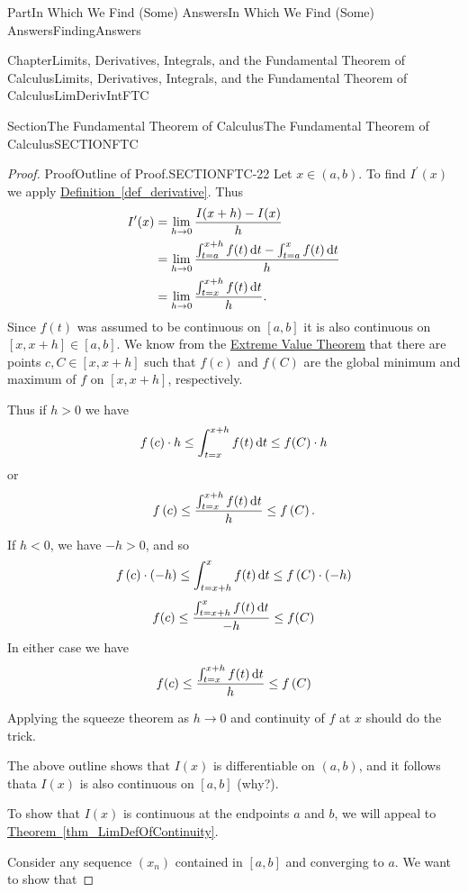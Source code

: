 \documentclass[oneside,10pt,]{book}
\newcommand{\xreffont}{\relax}
\numberwithin{equation}{part}
\newcommand{\dx}[1]{\,{\rm d}#1}
\def\limit#1#2#3{{\displaystyle\lim_{#1\rightarrow #2}#3}}
\newcommand{\lt}{<}
\newcommand{\gt}{>}
\newcommand{\amp}{&}
\begin{document}
\begin{partptx}{Part}{In Which We Find (Some) Answers}{}{In Which We Find (Some) Answers}{}{}{FindingAnswers}
\begin{chapterptx}{Chapter}{Limits, Derivatives, Integrals, and the Fundamental Theorem of Calculus}{}{Limits, Derivatives, Integrals, and the Fundamental Theorem of Calculus}{}{}{LimDerivIntFTC}
\begin{sectionptx}{Section}{The Fundamental Theorem of Calculus}{}{The Fundamental Theorem of Calculus}{}{}{SECTIONFTC}
\begin{proof}{Proof}{Outline of Proof.}{SECTIONFTC-22}
Let \(x\in (a,b)\). To find \(I^\prime (x)\) we apply \hyperref[def_derivative]{Definition~{\xreffont\ref{def_derivative}}}. Thus%
\begin{align*}
I^\prime (x)\amp{} = \limit{h}{0}{\frac{I(x+h)-I(x)}{h}}\\
\amp{} =       \limit{h}{0}{\frac{\int_{t=a}^{x+h}f(t)\dx{t}-\int_{t=a}^x
f(t)\dx{t}}{h}}\\
\amp{}=\limit{h}{0}{\frac{\int_{t=x}^{x+h}f(t)\dx{t}}{h}}.
\end{align*}
        Since \(f(t)\) was assumed to be continuous on \([a,b]\) it is also continuous on \([x, x+h]\in [a,b]\). We know from the \hyperref[thm_EVT]{Extreme Value Theorem} that there are points \(c, C \in [x,x+h]\) such that \(f(c)\) and \(f(C)\) are the global minimum and maximum of \(f\) on \([x, x+h]\), respectively.%
\par
Thus if \(h\gt0\) we have%
\begin{equation*}
f\left(c\right)\cdot h\le
\int^{x+h}_{t=x}{f(t)\dx{t}}\le f(C)\cdot h
\end{equation*}
or%
\begin{equation*}
f\left(c\right)\le \frac{\int^{x+h}_{t=x}{f(t)\dx{t}}}{h}\le
f\left(C\right)\text{.}
\end{equation*}
%
\par
If \(h\lt 0\), we have \(-h>0\), and so%
\begin{equation*}
f\left(c\right)\cdot \left(-h\right)\le
\int^x_{t=x+h}{f(t)\dx{t}}\le f\left(C\right)\cdot (-h)
\end{equation*}
%
\begin{equation*}
f(c)\le \frac{\int^x_{t=x+h}{f(t)\dx{t}}}{-h}\le f(C)
\end{equation*}
In either case we have%
\begin{equation*}
f(c)\le \frac{\int^{x+h}_{t=x}{f(t)\dx{t}}}{h}\le f\left(C\right)
\end{equation*}
%
\par
Applying the squeeze theorem as \(h\to 0\) and continuity of \(f\) at \(x\) should do the trick.%
\par
The above outline shows that \(I(x)\) is differentiable on \((a,b)\), and it follows thata \(I(x)\) is also continuous on \([a,b]\) (why?).%
\par
To show that \(I(x)\) is  continuous  at the endpoints \(a\) and \(b\), we will appeal to \hyperref[thm_LimDefOfContinuity]{Theorem~{\xreffont\ref{thm_LimDefOfContinuity}}}.%
\par
Consider any sequence \((x_n)\) contained in \([a,b]\) and converging to \(a\). We want to show that%

\end{proof}
\end{sectionptx}
\end{chapterptx}
\end{partptx}
\end{document}
